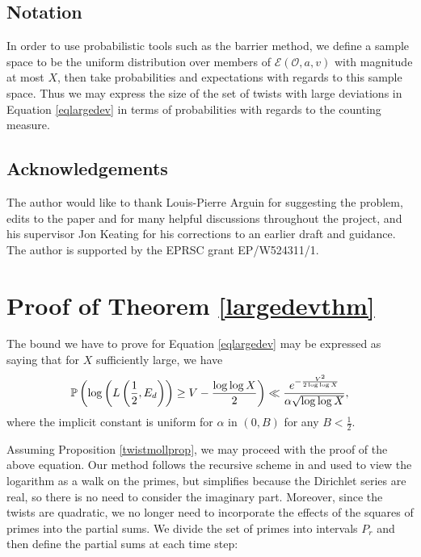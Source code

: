 \documentclass[12pt]{amsart}
\def\P{\ensuremath\mathbb{P}}
\numberwithin{equation}{section}
\numberwithin{thm}{section}
\newcommand{\1}{\mathbf 1}
\begin{document}
 \subsection{Notation}
 In order to use probabilistic tools such as the barrier method, we define a sample space to be the uniform distribution over members of $\mathcal{E}(\mathscr{O},a,v)$ with magnitude at most $X$, then take probabilities and expectations with regards to this sample space. Thus we may express the size of the set of twists with large deviations in Equation \eqref{eqlargedev} in terms of probabilities with regards to the counting measure.

\subsection{Acknowledgements} The author would like to thank Louis-Pierre Arguin for suggesting the problem, edits to the paper  and for many helpful discussions throughout the project, and his supervisor Jon Keating for his corrections to an earlier draft and guidance.  The author is supported by the EPRSC grant EP/W524311/1.  
\section{Proof of Theorem \ref{largedevthm}}\label{SecLD}The bound we have to prove for Equation \eqref{eqlargedev} may be expressed as saying that for $X$ sufficiently large, we have
\begin{equation}\label{countbig}
	\P\left(  \log\left(L\left(\frac{1}{2}, E_d\right)\right)\ge V-\frac{\log\log X}{2}\right)\ll \frac{e^{-\frac{V^2}{2\log\log X}}}{\alpha\sqrt{\log\log X}},
\end{equation} 
where the implicit constant is uniform for $\alpha$ in $(0,B)$ for any $B<\frac{1}{2}.$

Assuming Proposition \ref{twistmollprop}, we may proceed with the proof of the above equation. Our method follows the recursive scheme in \cite{AB} and \cite{AC25} used to view the logarithm as a walk on the primes, but simplifies because the Dirichlet series are real, so there is no need to consider the imaginary part. Moreover, since the twists are quadratic, we no longer need to incorporate the effects of the squares of primes into the partial sums. 
We divide the set of primes into intervals $P_r$ and then define the partial sums at each time step:
\end{document}
